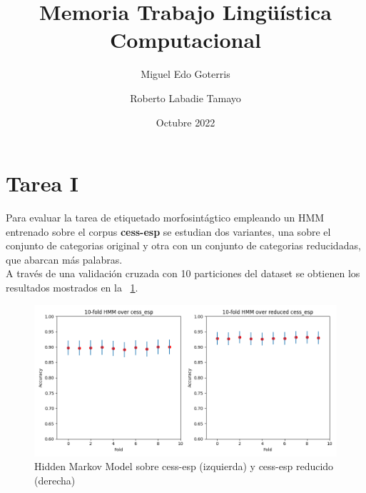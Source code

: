 \documentclass[11pt,a4paper]{report}
\date{}
\begin{document}
\title{Memoria Trabajo Lingüística Computacional}
\author{  Miguel Edo Goterris\and Roberto Labadie Tamayo}
	\date{Octubre 2022}
	\maketitle
	
	
	\section*{Tarea I}
		
		Para evaluar la tarea de etiquetado morfosintágtico empleando un HMM entrenado sobre el corpus \textbf{cess-esp} se estudian dos variantes, una sobre el conjunto de categorias original y otra con un conjunto de categorias reducidadas, que abarcan más palabras.\\
		
		A través de una validación cruzada con 10 particiones del dataset se obtienen los resultados mostrados en la \figurename~\ref{HMM_task1}.
		
		\begin{figure}[!thb]
		\begin{center}
			\includegraphics[scale=0.6]{images/HMM_task1.png}
		\end{center}
		\caption{Hidden Markov Model sobre cess-esp (izquierda) y cess-esp reducido (derecha) }
		\label{HMM_task1}
	\end{figure}
	
\end{document}
